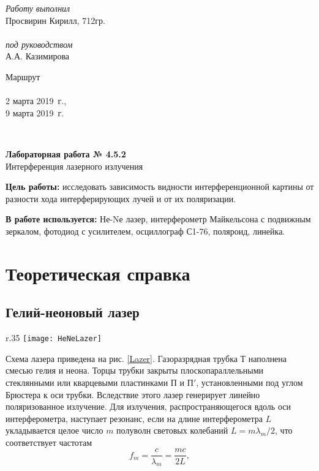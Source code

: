 \documentclass{MagicLabs}
\begin{document}
	
	
\begin{minipage}[l]{0.3\textwidth}
	\textit{Работу выполнил}\\
	Просвирин Кирилл, 712гр.\\\\
	\textit{под руководством}\\
	А.А. Казимирова
\end{minipage}
\hfill
\begin{minipage}[l]{0.21\textwidth}
	Маршрут  \\\\
	2 марта 2019~г.,\\
	9 марта 2019~г.\\
\end{minipage}
\\[20pt]
\begin{center}
	\LARGE{\textbf{Лабораторная работа № 4.5.2}\\
		Интерференция лазерного излучения\\[20pt]}
\end{center}



\textbf{Цель работы: }исследовать зависимость видности интерференционной картины от разности хода интерферирующих лучей и от их поляризации.

\textbf{В работе используется: }Не-Nе лазер, интерферометр Майкельсона с подвижным зеркалом, фотодиод с усилителем, осциллограф С1-76, поляроид, линейка.


\section{Теоретическая справка}

\subsection*{Гелий-неоновый лазер}

\begin{wrapfigure}[6]{r}{.35\textwidth}\centering
	\vspace{-3ex}
	\texttt{[image: HeNeLazer]}
	\caption{Схема лазера}
	\label{Lazer}
\end{wrapfigure}

Схема лазера приведена на рис. \ref{Lazer}. Газоразрядная трубка Т наполнена
смесью гелия и неона. Торцы трубки  закрыты плоскопараллельными стеклянными или
кварцевыми пластинками $ П $ и $ П' $, установленными под углом Брюстера к оси трубки.
Вследствие этого лазер генерирует 
линейно поляризованное излучение. Для излучения, распространяющегося вдоль оси
интерферометра, наступает резонанс, если на длине интерферометра $ L $ 
укладывается целое число $ m $ полуволн световых колебаний $ L = m\lambda_m/2 $, 
что соответствует частотам
\begin{equation}\label{frequency}
	f_m=\dfrac{c}{\lambda_m}=\dfrac{mc}{2L},
\end{equation}
 
\end{document}
